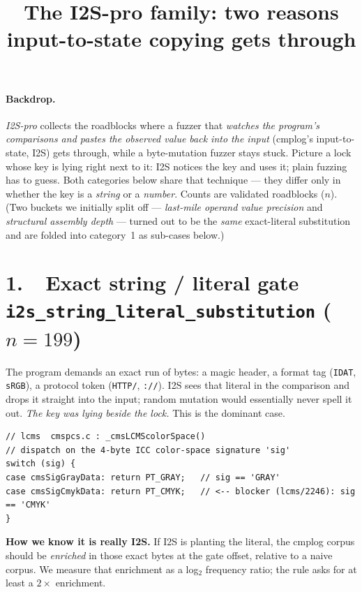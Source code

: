 \documentclass[11pt]{article}
\title{\textbf{The I2S-pro family: two reasons input-to-state copying gets through}}
\author{}
\date{}
\begin{document}
\maketitle
\vspace{-3em}

\paragraph{Backdrop.} \emph{I2S-pro} collects the roadblocks where a fuzzer that
\emph{watches the program's comparisons and pastes the observed value back into
the input} (cmplog's input-to-state, I2S) gets through, while a byte-mutation
fuzzer stays stuck. Picture a lock whose key is lying right next to it: I2S
notices the key and uses it; plain fuzzing has to guess. Both categories
below share that technique --- they differ only in whether the key is a
\emph{string} or a \emph{number}. Counts are validated roadblocks ($n$). (Two
buckets we initially split off --- \emph{last-mile operand value precision} and
\emph{structural assembly depth} --- turned out to be the \emph{same} exact-literal
substitution and are folded into category~1 as sub-cases below.)

\section*{1.\ \ Exact string / literal gate \hfill {\normalsize\texttt{i2s\_string\_literal\_substitution} ($n=199$)}}
The program demands an exact run of bytes: a magic header, a format tag
(\texttt{IDAT}, \texttt{sRGB}), a protocol token (\texttt{HTTP/}, \texttt{://}).
I2S sees that literal in the comparison and drops it straight into the input;
random mutation would essentially never spell it out. \emph{The key was lying
beside the lock.} This is the dominant case.

\begin{lstlisting}[style=c]
// lcms  cmspcs.c : _cmsLCMScolorSpace()
// dispatch on the 4-byte ICC color-space signature 'sig'
switch (sig) {
case cmsSigGrayData: return PT_GRAY;   // sig == 'GRAY'
case cmsSigCmykData: return PT_CMYK;   // <-- blocker (lcms/2246): sig == 'CMYK'
}
\end{lstlisting}

\noindent\textbf{How we know it is really I2S.} If I2S is planting the literal,
the cmplog corpus should be \emph{enriched} in those exact bytes at the gate
offset, relative to a naive corpus. We measure that enrichment as a log$_2$
frequency ratio; the rule asks for at least a $2\times$ enrichment.
\end{document}

